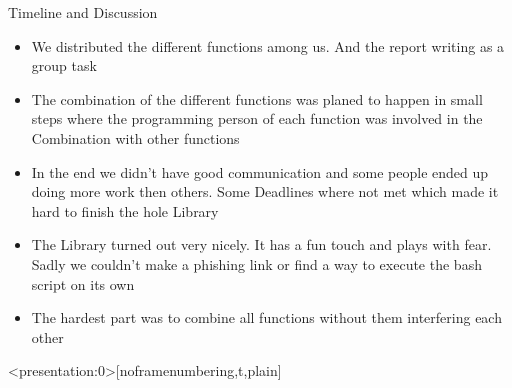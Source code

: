 \documentclass[aspectratio=169,xcolor=table]{beamer}
\newif\ifincludebackup
\begin{document}
\begin{frame}[c]{Timeline and Discussion}

\begin{itemize}

    \item We distributed the different functions among us. And the report writing as a group 
        task
    \item The combination of the different functions was planed to happen in small steps 
        where the programming person of each function was involved in the Combination 
        with other functions
    \item In the end we didn't have good communication and some people ended up doing 
        more work then others. Some Deadlines where not met which made it hard to 
        finish the hole Library
    \item The Library turned out very nicely. It has a fun touch and plays with fear. 
        Sadly we couldn't make a phishing link or find a way to execute the bash script 
        on its own 
    \item The hardest part was to combine all functions without them interfering each other 

\end{itemize}


\end{frame}



\begin{frame}<presentation:0>[noframenumbering,t,plain]
\end{frame}


\ifincludebackup

    \begin{frame}[c]{Backup Slides ifdesired
        \begin{itemize}
            \item ...
            \item ...
        \end{itemize}
    \end{frame}    
\fi
\end{document}
